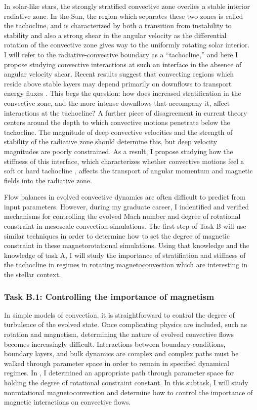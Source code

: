 \documentclass[aasms,11pt]{article}
\begin{document}
In solar-like stars, the strongly stratified convective zone overlies a stable interior radiative zone.
In the Sun, the region which separates these two zones is called the tachocline, and is characterized by both a transition from instability to stability and also a strong shear in the angular velocity as the differential rotation of the convective zone gives way to the uniformly rotating solar interior.
I will refer to the radiative-convective boundary as a ``tachocline,'' and here I propose studying convective interactions at such an interface in the absence of angular velocity shear. 
Recent results suggest that convecting regions which reside above stable layers may depend primarily on downflows to transport energy fluxes \citep{kapyla&all2017}.
This begs the question: how does increased stratification in the convective zone, and the more intense downflows that accompany it, affect interactions at the tachocline?
A further piece of disagreement in current theory centers around the depth to which convective motions penetrate below the tachocline.
The magnitude of deep convective velocities and the strength of stability of the radiative zone should determine this, but deep velocity magnitudes are poorly constrained.
As a result, I propose studying how the stiffness of this interface, which characterizes whether convective motions feel a soft or hard tachocline \citep{couston&all2017}, affects the transport of angular momentum and magnetic fields into the radiative zone.

Flow balances in evolved convective dynamics are often difficult to predict from input parameters.
However, during my graduate career, I indentified and verified mechanisms for controlling the evolved Mach number \citep{anders&brown2017} and degree of rotational constraint \citep[][and Fig. \ref{fig:rossby_plot}]{anders&all2019} in mesoscale convection simulations.
The first step of Task B will use similar techniques in order to determine how to set the degree of magnetic constraint in these magnetorotational simulations.
Using that knowledge and the knowledge of task A, I will study the importance of stratifiation and stiffness of the tachocline in regimes in rotating magnetoconvection which are interesting in the stellar context.

\subsubsection{Task B.1: Controlling the importance of magnetism}
\label{sct:taskB1}
In simple models of convection, it is straightforward to control the degree of turbulence of the evolved state.
Once complicating physics are included, such as rotation and magnetism, determining the nature of evolved convective flows becomes increasingly difficult.
Interactions between boundary conditions, boundary layers, and bulk dynamics are complex and complex paths must be walked through parameter space in order to remain in specified dynamical regimes.
In \citet{anders&all2019}, I determined an appropriate path through parameter space for holding the degree of rotational constraint constant.
In this subtask, I will study nonrotational magnetoconvection and determine how to control the importance of magnetic interactions on convective flows.
\end{document}
